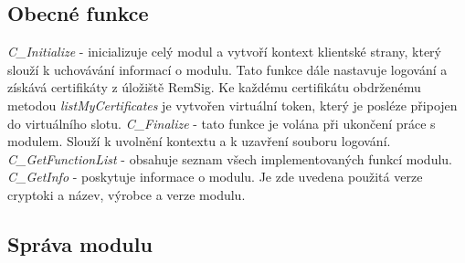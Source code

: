 \documentclass[]{fithesis3}
\begin{document}
	\subsection{Obecné funkce} 
	\textit{C\_Initialize} - inicializuje celý modul a vytvoří kontext klientské strany, který slouží k 		uchovávání informací o modulu. Tato funkce dále nastavuje logování a získává certifikáty z 			úložiště RemSig. Ke každému certifikátu obdrženému metodou \textit{listMyCertificates} je 			vytvořen virtuální token, který je posléze připojen do virtuálního slotu. 
	\newline
 	\newline
	\textit{C\_Finalize} - tato funkce je volána při ukončení práce s modulem. Slouží k uvolnění 			kontextu a k uzavření souboru logování.
	\newline
	\newline
	\textit{C\_GetFunctionList} - obsahuje seznam všech implementovaných funkcí modulu.
	\newline
	\newline
	\textit{C\_GetInfo} - poskytuje informace o modulu. Je zde uvedena použitá verze 				cryptoki a název, výrobce a verze modulu.

	\subsection{Správa modulu} 
\end{document}
